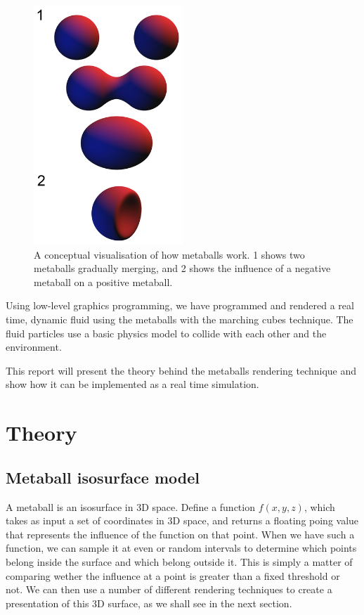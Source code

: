 \documentclass{article}
\begin{document}
\begin{multicols}{2}
    \begin{figure}[H]
    	\centering
    	\begin{minipage}[b]{0.4\textwidth}
    		\centering
	        \includegraphics[width=0.5\textwidth]{img/metaballs-concept.png}
            \caption{A conceptual visualisation of how metaballs work. 1 shows two metaballs gradually merging, and 2 shows the influence of a negative metaball on a positive metaball. \cite{wiki07}}
	        \label{fig:metaballs-concept}
		\end{minipage}
    \end{figure}

	Using low-level graphics programming, we have programmed and rendered a real time, dynamic fluid using the metaballs with the marching cubes technique. The fluid particles use a basic physics model to collide with each other and the environment.

    This report will present the theory behind the metaballs rendering technique and show how it can be implemented as a real time simulation.

    \section{Theory}

        \subsection{Metaball isosurface model}
            A metaball is an isosurface in 3D space. 
            Define a function $f(x,y,z)$, which takes as input a set of coordinates in 3D space, and returns a floating poing value that represents the influence of the function on that point.
            When we have such a function, we can sample it at even or random intervals to determine which points belong inside the surface and which belong outside it.
            This is simply a matter of comparing wether the influence at a point is greater than a fixed threshold or not.
            We can then use a number of different rendering techniques to create a presentation of this 3D surface, as we shall see in the next section.


\end{multicols}
\end{document}
